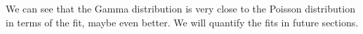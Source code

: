 \documentclass[11pt]{book} %
\begin{document}
We can see that the Gamma distribution is very close to the Poisson distribution in terms of the fit, maybe even better. We will quantify the fits in future sections.













\end{document}
